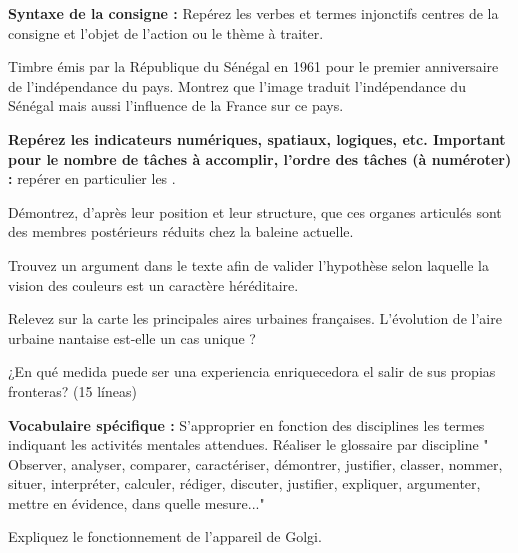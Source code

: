 \hspace{16pt}\pointCyan \textbf{Syntaxe de la consigne :} Repérez les verbes et termes injonctifs centres de la consigne et l'objet de l'action ou le thème à traiter.

\begin{encart}  
  Timbre émis par la République du Sénégal en 1961 pour le premier anniversaire de l'indépendance du pays.
  Montrez que l'image traduit l'indépendance du Sénégal mais aussi l'influence de la France sur ce pays.
\end{encart}


\hspace{16pt}\pointCyan \textbf{Repérez les indicateurs numériques, spatiaux, logiques, etc.
Important pour le nombre de tâches à accomplir, l'ordre des tâches (à numéroter) :} repérer en particulier les \og {} \fg.

\begin{encart}
  Démontrez, d'après leur position et leur structure, que ces organes articulés sont des membres postérieurs réduits chez la baleine actuelle.
\end{encart}

\begin{encart}
  Trouvez un argument dans le texte afin de valider l'hypothèse selon laquelle la vision des couleurs est un caractère héréditaire.
\end{encart}

\begin{encart}  
  Relevez sur la carte les principales aires urbaines françaises. L'évolution de l'aire urbaine nantaise est-elle un cas unique ?
\end{encart}

\begin{encart}  
  ¿En qué medida puede ser una experiencia enriquecedora el salir de sus propias fronteras? (15 líneas)
\end{encart}


\hspace{16pt}\pointCyan \textbf{Vocabulaire spécifique :}
S'approprier en fonction des disciplines les termes indiquant les activités mentales attendues.
Réaliser le glossaire par discipline " Observer, analyser, comparer, caractériser, démontrer, justifier,
classer, nommer, situer, interpréter, calculer, rédiger, discuter, justifier, expliquer, argumenter, mettre en évidence, dans quelle mesure..."

\begin{encart}  
  Expliquez le fonctionnement de l'appareil de Golgi.
\end{encart}


